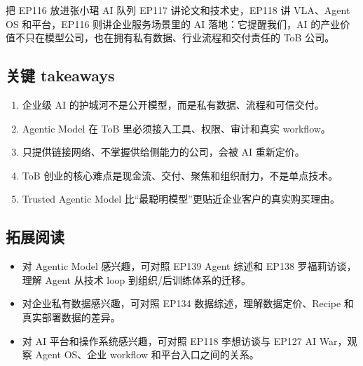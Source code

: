 \documentclass[a4paper]{article}
\begin{document}
\begin{importantbox}{把 EP116 放进张小珺 AI 队列}
EP117 讲论文和技术史，EP118 讲 VLA、Agent OS 和平台，EP116 则讲企业服务场景里的 AI 落地：它提醒我们，AI 的产业价值不只在模型公司，也在拥有私有数据、行业流程和交付责任的 ToB 公司。
\end{importantbox}

\subsection{关键 takeaways}

\begin{enumerate}
\item 企业级 AI 的护城河不是公开模型，而是私有数据、流程和可信交付。
\item Agentic Model 在 ToB 里必须接入工具、权限、审计和真实 workflow。
\item 只提供链接网络、不掌握供给侧能力的公司，会被 AI 重新定价。
\item ToB 创业的核心难点是现金流、交付、聚焦和组织耐力，不是单点技术。
\item Trusted Agentic Model 比“最聪明模型”更贴近企业客户的真实购买理由。
\end{enumerate}

\subsection{拓展阅读}

\begin{itemize}
\item 对 Agentic Model 感兴趣，可对照 EP139 Agent 综述和 EP138 罗福莉访谈，理解 Agent 从技术 loop 到组织/后训练体系的迁移。
\item 对企业私有数据感兴趣，可对照 EP134 数据综述，理解数据定价、Recipe 和真实部署数据的差异。
\item 对 AI 平台和操作系统感兴趣，可对照 EP118 李想访谈与 EP127 AI War，观察 Agent OS、企业 workflow 和平台入口之间的关系。
\end{itemize}
\end{document}
